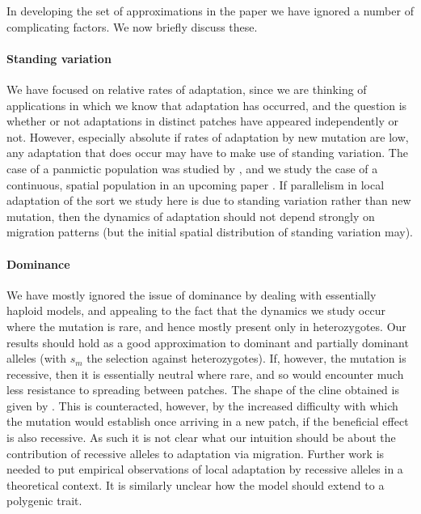 \documentclass{article}
\newcommand{\linelabel}[1]{}
\newcommand{\citep}[1]{\cite{#1}}
\newcommand{\citet}[1]{\cite{#1}}
\begin{document}
In developing the set of approximations in the paper we have ignored a
number of complicating factors. We now briefly discuss these.

\paragraph{Standing variation} 
We have focused on relative rates of adaptation,
since we are thinking of applications in which we know that adaptation has occurred,
and the question is whether or not adaptations in distinct patches
have appeared independently or not.
However, especially absolute if rates of adaptation by new mutation are low,
any adaptation that does occur may have to make use of standing variation.
The case of a panmictic population was studied by \citet{softsweepsI},
and we study the case of a continuous, spatial population in an upcoming paper \citep{ralph2014standing}.
If parallelism in local adaptation of the sort we study here is due to standing variation
rather than new mutation,
then the dynamics of adaptation should not depend strongly on migration patterns
(but the initial spatial distribution of standing variation may).

\paragraph{Dominance}
We have mostly ignored the issue of dominance 
by dealing with essentially haploid models,
and appealing to the fact that the dynamics we study occur where the mutation is rare,
and hence mostly present only in heterozygotes. 
Our results should hold as a good approximation to dominant and partially dominant alleles
(with $s_m$ the selection against heterozygotes).
If, however, the mutation is recessive, then it is essentially neutral where rare,
and so would encounter much less resistance to spreading between patches.
The shape of the cline obtained is given by \citet{haldane1948theory}.
This is counteracted, however, by the increased difficulty with which the mutation would establish
once arriving in a new patch,
if the beneficial effect is also recessive. \linelabel{rr:dominance}
As such it is not clear what our intuition should be 
about the contribution of recessive alleles to adaptation via migration. 
Further work is needed to put empirical observations of local adaptation by recessive alleles 
in a theoretical context.
It is similarly unclear how the model should extend to a polygenic trait.
\end{document}
